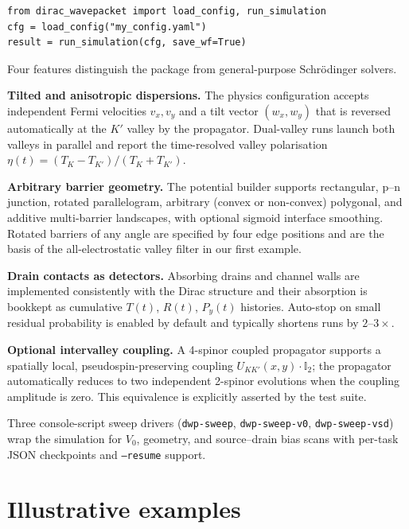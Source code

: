 \documentclass[preprint, 12pt, a4paper]{elsarticle}
\begin{document}
\begin{verbatim}
from dirac_wavepacket import load_config, run_simulation
cfg = load_config("my_config.yaml")
result = run_simulation(cfg, save_wf=True)
\end{verbatim}

Four features distinguish the package from general-purpose
Schr\"odinger solvers.

\textbf{Tilted and anisotropic dispersions.} The physics
configuration accepts independent Fermi velocities $v_x, v_y$ and a
tilt vector $(w_x, w_y)$ that is reversed automatically at the $K'$
valley by the propagator. Dual-valley runs launch both valleys in
parallel and report the time-resolved valley polarisation
$\eta(t)=(T_K-T_{K'})/(T_K+T_{K'})$.

\textbf{Arbitrary barrier geometry.} The potential builder supports
rectangular, p--n junction, rotated parallelogram, arbitrary
(convex or non-convex) polygonal, and additive multi-barrier
landscapes, with optional sigmoid interface smoothing. Rotated
barriers of any angle are specified by four edge positions and are
the basis of the all-electrostatic valley filter in our first
example.

\textbf{Drain contacts as detectors.} Absorbing drains and channel
walls are implemented consistently with the Dirac structure and their
absorption is bookkept as cumulative $T(t)$, $R(t)$, $P_y(t)$
histories. Auto-stop on small residual probability is enabled by
default and typically shortens runs by $2\text{--}3\times$.

\textbf{Optional intervalley coupling.} A 4-spinor coupled
propagator supports a spatially local, pseudospin-preserving coupling
$U_{KK'}(x,y)\cdot \mathbb{I}_2$; the propagator automatically
reduces to two independent 2-spinor evolutions when the coupling
amplitude is zero. This equivalence is explicitly asserted by the
test suite.

Three console-script sweep drivers (\texttt{dwp-sweep},
\texttt{dwp-sweep-v0}, \texttt{dwp-sweep-vsd}) wrap the
simulation for $V_0$, geometry, and source--drain bias scans with
per-task JSON checkpoints and \texttt{--resume} support.

\section{Illustrative examples}
\label{sec:examples}
\end{document}
